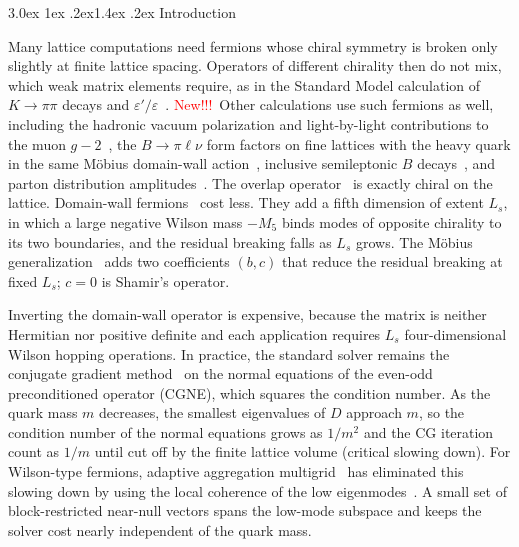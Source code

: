 \documentclass[11pt,a4paper]{article}
\makeatletter
\newif\ifshownew \shownewtrue
\DeclareRobustCommand\New{\ifshownew\textcolor{red}{New!!!}\ \else\ignorespaces\fi}
\renewcommand\section{\@startsection{section}{1}{\z@}%
  {3.0ex \@plus 1ex \@minus .2ex}{1.4ex \@plus .2ex}%
  {\centering\normalfont\normalsize\bfseries}}
\newcommand\FloatBarrier{\par\begingroup\let\@elt\relax
  \edef\@tempa{\@botlist\@deferlist\@dbldeferlist}%
  \ifx\@tempa\@empty\else\clearpage\fi\endgroup}
\let\origsection\section
\renewcommand\section{\FloatBarrier\origsection}
\numberwithin{equation}{section}
\makeatother
\begin{document}
\setcounter{tocdepth}{3}
\tableofcontents

\section{Introduction}
\label{sec:intro}

Many lattice computations need fermions whose chiral symmetry is broken only slightly at finite
lattice spacing. Operators of different chirality then do not mix, which weak matrix elements
require, as in the Standard Model calculation of $K\to\pi\pi$ decays and
$\varepsilon'/\varepsilon$~\cite{RBCKpipi}. \New Other calculations use
such fermions as well, including the hadronic vacuum polarization and light-by-light contributions to the
muon $g-2$~\cite{RBCHVP,RBCWindow,RBCHLbL}, the $B\to\pi\ell\nu$ form factors on fine lattices
with the heavy quark in the same M\"obius domain-wall action~\cite{JLQCDBpi}, inclusive
semileptonic $B$ decays~\cite{HashimotoInclusive,GambinoInclusive,BaroneInclusive}, and parton
distribution amplitudes~\cite{BakerPionDA}. The overlap operator~\cite{NarayananNeuberger,Neuberger}
is exactly chiral on the lattice. Domain-wall fermions~\cite{Kaplan,Shamir,FurmanShamir} cost less.
They add a fifth dimension of extent $L_s$, in which a large negative Wilson mass $-M_5$ binds modes
of opposite chirality to its two boundaries, and the residual breaking falls as $L_s$ grows. The
M\"obius generalization~\cite{BNO0,BNO1,BNO} adds two coefficients $(b,c)$ that reduce the residual
breaking at fixed $L_s$; $c=0$ is Shamir's operator.

Inverting the domain-wall operator is expensive, because the matrix is neither Hermitian nor
positive definite and each application requires $L_s$ four-dimensional Wilson hopping operations.
In practice, the standard solver remains the conjugate gradient method~\cite{HestenesStiefel} on
the normal equations of the even-odd preconditioned operator (CGNE), which squares the condition
number. As the quark mass $m$ decreases, the smallest eigenvalues of $D$ approach $m$, so the
condition number of the normal equations grows as $1/m^2$ and the CG iteration count as $1/m$ until
cut off by the finite lattice volume (critical slowing down). For Wilson-type fermions, adaptive
aggregation multigrid~\cite{Brannick,Babich,OsbornClover,DDalphaAMG,ClarkQUDA,BridgeMG} has
eliminated this slowing down by using the local coherence of the low eigenmodes~\cite{Luscher}. A
small set of block-restricted near-null vectors spans the low-mode subspace and keeps the solver
cost nearly independent of the quark mass.
\end{document}
